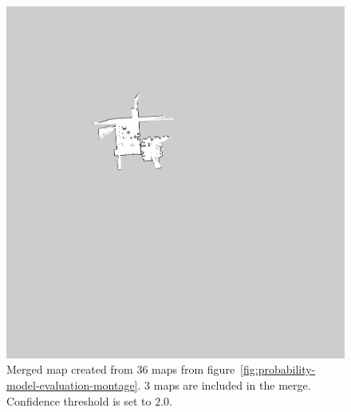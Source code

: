 \begin{figure}
    \centering
    \includegraphics[width=\textwidth]{../img/probability-model-evaluation-treshold_2_0-3maps.png}
    \caption{Merged map created from $36$ maps from figure~\ref{fig:probability-model-evaluation-montage}. $3$ maps are included in the merge. Confidence threshold is set to $2.0$.}
    \label{fig:probability-model-evaluation-treshold_2.0-3maps}
\end{figure}

